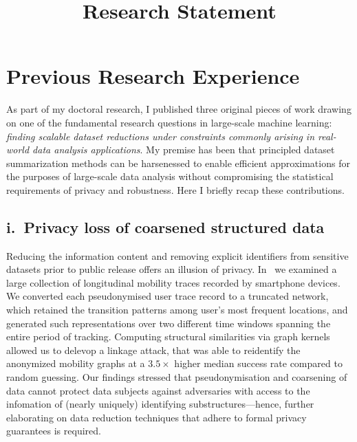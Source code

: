 \documentclass[11pt,a4paper,sans]{moderncv} %
\title{Research Statement}
\begin{document}
\makecvtitle %

\section{Previous Research Experience}


As part of my doctoral research, I published three original pieces of work drawing on one of the fundamental research questions in large-scale machine learning: \emph{finding scalable dataset reductions under constraints commonly arising in real-world data analysis applications}. My premise has been that principled dataset summarization methods can be harsenessed to enable efficient approximations for the purposes of large-scale data analysis without compromising the statistical requirements of privacy and robustness. Here I briefly recap these contributions.


\subsection{i.~Privacy loss of coarsened structured data}
\label{subsec:ch3-summary}
Reducing the information content and removing explicit identifiers from sensitive datasets prior to public release offers an illusion of privacy.   In~\citep{manousakas2018quantifying} we examined a large collection of longitudinal mobility traces recorded by smartphone devices. We converted each pseudonymised user trace record to a truncated network, which retained the transition patterns among user's most frequent locations, and generated such representations over two different time windows spanning the entire period of tracking. Computing structural similarities via graph kernels allowed us to delevop a linkage attack, that was able to reidentify the anonymized mobility graphs at a $3.5\times$ higher median success rate compared to random guessing. Our findings stressed that pseudonymisation and coarsening of data cannot protect data subjects against adversaries with access to the infomation of (nearly uniquely) identifying substructures---hence, further elaborating on data reduction techniques that adhere to formal privacy guarantees is required.
\end{document}
